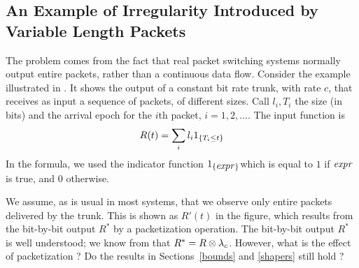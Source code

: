 \subsection{An Example of Irregularity Introduced by Variable Length Packets}
 The problem comes from the fact that real
packet switching systems normally output entire packets, rather
than a continuous data flow. Consider the example illustrated in
. It shows the output of a constant bit rate trunk,
with rate $c$, that receives as input a sequence of packets, of
different sizes. Call $l_i, T_i$ the size (in bits) and the
arrival epoch for the $i$th packet, $i=1,2,...$. The input
function is
\begin{equation}\mylabel{eq-rvlp}
  R(t)= \sum_i l_i 1_{\{T_i \leq t \}}
\end{equation}
In the formula, we used the indicator
 function
 $1_{\{\mbox{\emph{expr}}\}}$which
 is equal to $1$ if $\mbox{\emph{expr}}$ is
 true, and $0$ otherwise.%
%

We assume, as is usual in most systems, that we observe only
entire packets delivered by the trunk. This is shown as $R'(t)$ in
the figure, which results from the bit-by-bit output $R^*$ by a
packetization operation. The bit-by-bit output $R^*$ is well
understood; we know from  that  $R^*=R \otimes
\lambda_c$. However, what is the effect of packetization ? Do the
results in Sections~\ref{bounds} and \ref{shapers} still hold ?


\begin{figure}[htbp]
\end{figure}

